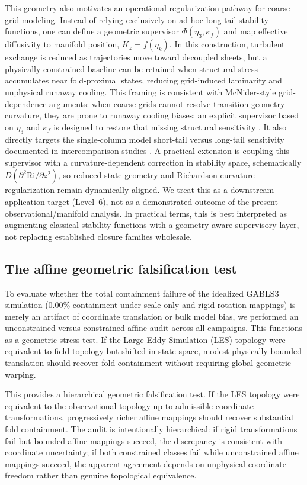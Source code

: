 \documentclass[12pt,a4paper]{article}
\begin{document}
This geometry also motivates an operational regularization pathway for coarse-grid modeling. Instead of relying exclusively on ad-hoc long-tail stability functions, one can define a geometric supervisor $\Phi(\eta_3,\kappa_f)$ and map effective diffusivity to manifold position, $K_z = f(\eta_k)$. In this construction, turbulent exchange is reduced as trajectories move toward decoupled sheets, but a physically constrained baseline can be retained when structural stress accumulates near fold-proximal states, reducing grid-induced laminarity and unphysical runaway cooling. This framing is consistent with McNider-style grid-dependence arguments: when coarse grids cannot resolve transition-geometry curvature, they are prone to runaway cooling biases; an explicit supervisor based on $\eta_3$ and $\kappa_f$ is designed to restore that missing structural sensitivity \citep{mcnider2012}. It also directly targets the single-column model short-tail versus long-tail sensitivity documented in intercomparison studies \citep{costa2020sbl}. A practical extension is coupling this supervisor with a curvature-dependent correction in stability space, schematically $D(\partial^2\mathrm{Ri}/\partial z^2)$, so reduced-state geometry and Richardson-curvature regularization remain dynamically aligned. We treat this as a downstream application target (Level~6), not as a demonstrated outcome of the present observational/manifold analysis. In practical terms, this is best interpreted as augmenting classical stability functions with a geometry-aware supervisory layer, not replacing established closure families wholesale.

\subsection{The affine geometric falsification test}
\label{subsec:affine_falsification}

To evaluate whether the total containment failure of the idealized GABLS3 simulation ($0.00\%$ containment under scale-only and rigid-rotation mappings) is merely an artifact of coordinate translation or bulk model bias, we performed an unconstrained-versus-constrained affine audit across all campaigns. This functions as a geometric stress test. If the Large-Eddy Simulation (LES) topology were equivalent to field topology but shifted in state space, modest physically bounded translation should recover fold containment without requiring global geometric warping.

This provides a hierarchical geometric falsification test. If the LES topology were equivalent to the observational topology up to admissible coordinate transformations, progressively richer affine mappings should recover substantial fold containment. The audit is intentionally hierarchical: if rigid transformations fail but bounded affine mappings succeed, the discrepancy is consistent with coordinate uncertainty; if both constrained classes fail while unconstrained affine mappings succeed, the apparent agreement depends on unphysical coordinate freedom rather than genuine topological equivalence.
\end{document}

